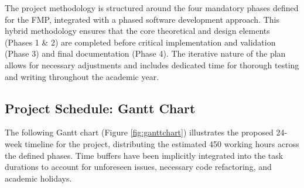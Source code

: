 The project methodology is structured around the four mandatory phases defined for the FMP, integrated with a phased software 
development approach. This hybrid methodology ensures that the core theoretical and design elements (Phases 1 \& 2) are completed 
before critical implementation and validation (Phase 3) and final documentation (Phase 4). The iterative nature of the plan allows 
for necessary adjustments and includes dedicated time for thorough testing and writing throughout the academic year.

\subsection{Project Schedule: Gantt Chart}
\label{subsec:gantt}

The following Gantt chart (Figure \ref{fig:ganttchart}) illustrates the proposed 24-week timeline for the project, distributing the 
estimated 450 working hours across the defined phases. Time buffers have been implicitly integrated into the task durations to account 
for unforeseen issues, necessary code refactoring, and academic holidays.


